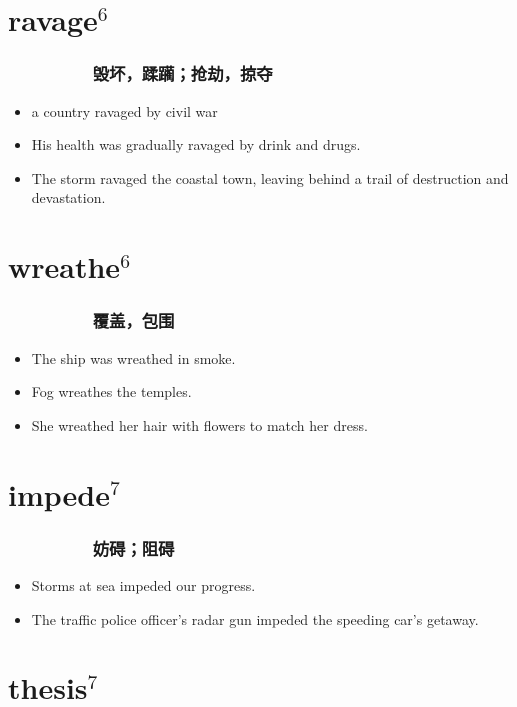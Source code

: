 \documentclass[UTF8,4pt,a3paper,space]{article}
\begin{document}
\begin{multicols}{4}
\section{ravage$^6$}
\subsubsection*{\ \ \ \ \ \ \ \ \ 毁坏，蹂躏；抢劫，掠夺}\begin{itemize}
\itemsep-0.5em
    \item a country ravaged by civil war    \item His health was gradually ravaged by drink and drugs.    \item The storm ravaged the coastal town, leaving behind a trail of destruction and devastation. 
\end{itemize}
\hrulefill


\section{wreathe$^6$}
\subsubsection*{\ \ \ \ \ \ \ \ \ 覆盖，包围}\begin{itemize}
\itemsep-0.5em
    \item The ship was wreathed in smoke.    \item Fog wreathes the temples.    \item She wreathed her hair with flowers to match her dress. 
\end{itemize}
\hrulefill


\section{impede$^7$}
\subsubsection*{\ \ \ \ \ \ \ \ \ 妨碍；阻碍}\begin{itemize}
\itemsep-0.5em
    \item Storms at sea impeded our progress.    \item The traffic police officer's radar gun impeded the speeding car's getaway. 
\end{itemize}
\hrulefill


\section{thesis$^7$}

\end{multicols}
\end{document}
